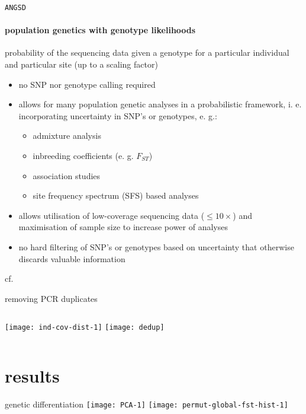 \documentclass[xcolor=pdftex,dvipsnames,table, handout]{beamer}
\begin{document}
\begin{frame}{\texttt{ANGSD}}
\framesubtitle{population genetics with genotype likelihoods}
\scriptsize
\begin{description}
\scriptsize
\item[genotype likelihood] probability of the sequencing data given a genotype for a particular individual and particular site (up to a scaling factor)\\[5pt]
\end{description}
\vskip10pt
\begin{itemize}
\item no SNP nor genotype calling required\pause
\item allows for many population genetic analyses in a probabilistic framework, i. e. incorporating uncertainty in SNP's or genotypes, e. g.:
\begin{itemize}
\scriptsize
\item admixture analysis
\item inbreeding coefficients (e. g. $F_{ST}$)
\item association studies
\item site frequency spectrum (SFS) based analyses
\end{itemize}
\pause
\vskip5pt
\item allows utilisation of low-coverage sequencing data ($\le 10\times$) and maximisation of sample size to increase power of analyses\\[5pt]\pause
\item no hard filtering of SNP's or genotypes based on uncertainty that otherwise discards valuable information 
\end{itemize}
\vskip20pt
\raggedleft cf. \cite{Li2011, Nielsen2012}
\end{frame}
%
\begin{frame}{removing PCR duplicates}
\centering
\begin{columns}
\texttt{[image: ind-cov-dist-1]}
\texttt{[image: dedup]}
\end{columns}
\end{frame}

\section{results}

\begin{frame}{genetic differentiation}
\texttt{[image: PCA-1]}
\texttt{[image: permut-global-fst-hist-1]}
\end{frame}
\end{document}
